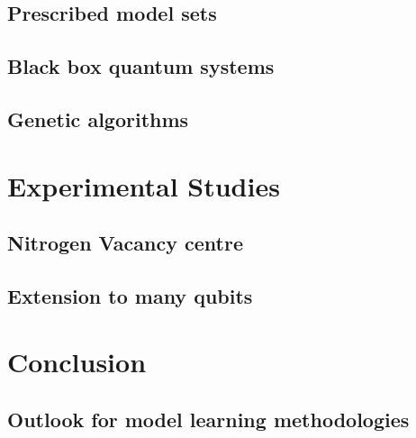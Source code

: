    \chapter{Prescribed model sets}\label{chapter:lattices}
        
    \chapter{Black box quantum systems}\label{chapter:black_box}
        
    \chapter{Genetic algorithms}\label{chapter:ga}
        

\part{Experimental Studies}\label{part:experimental_study}
    \chapter{Nitrogen Vacancy centre}\label{chapter:nv}
        
    \chapter{Extension to many qubits}\label{chapter:many_qubits}
        
    
\part{Conclusion}\label{part:conclusion}
    \chapter{Outlook for model learning methodologies}\label{chapter:outlook}
        



